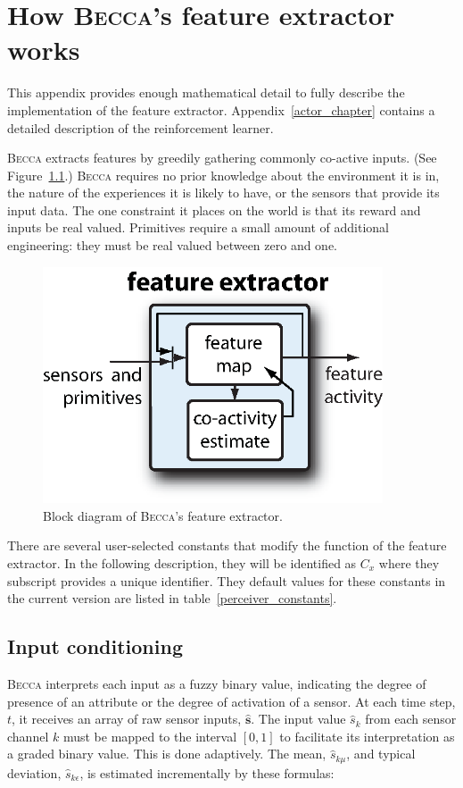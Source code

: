 \chapter{How \textsc{Becca}'s feature extractor works}
\label{perceiver_chapter}

This appendix provides enough mathematical detail to fully describe the implementation of the feature extractor. Appendix~\ref{actor_chapter} contains a detailed description of the reinforcement learner.

\textsc{Becca} extracts features by greedily gathering commonly co-active inputs. (See Figure~\ref{becca_feature_extractor}.)  \textsc{Becca} requires no prior knowledge about the environment it is in, the nature of the experiences it is likely to have, or the sensors that provide its input data. The one constraint it places on the world is that its reward and inputs be real valued. Primitives require a small amount of additional engineering: they must be real valued between zero and one. 

\begin{figure}
\centering 
\includegraphics[height=7cm]{figs/becca_feature_extractor.eps}
\caption{Block diagram of \textsc{Becca}'s feature extractor.}
\label{becca_feature_extractor}
\end{figure}

There are several user-selected constants that modify the function of the feature extractor. In the following description, they will be identified as $C_x$ where they subscript provides a unique identifier. They default values for these constants in the current version are listed in table~\ref{perceiver_constants}. 

\section{Input conditioning}
\textsc{Becca} interprets each input as a fuzzy binary value, indicating the degree of presence of an attribute or the degree of activation of a sensor. At each time step, $t$, it receives an array of raw sensor inputs, $\hat{\mathbf{s}}$. The input value $\hat{s}_k$ from each sensor channel $k$ must be mapped to the interval $[0,1]$ to facilitate its interpretation as a graded binary value. This is done adaptively. The mean, $\hat{s}_{k\mu}$, and typical deviation, $\hat{s}_{k\epsilon}$, is estimated incrementally by these formulas:

